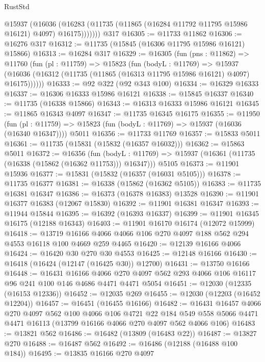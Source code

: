 \begin{lexlean}{RustStd}
\begin{coremodule}
          @15937
            (@16036
              (@16283 (@11735 (@11865 (@16284 @11792 @11795 @15986 @16121) @4097) @16175)))))))
    @317
@16305 := @11733 @11862
@16306 := @16276 @317
@16312 := @11735 (@15845 (@16306 @11795 @15986 @16121) @15866)
@16313 := @16284 @317
@16329 := @16305
    (fun (pns : @11862) =>
    @11760
      (fun (pl : @11759) =>
      @15823
        (fun (bodyL : @11769) =>
        @15937 (@16036 (@16312 (@11735 (@11865 (@16313 @11795 @15986 @16121) @4097) @16175))))))
@16333 := @92 @322 (@92 @343 @100)
@16334 := @16329 @16333
@16337 := @16306 @16333 @15986 @16121
@16338 := @15845 @16337
@16340 := @11735 (@16338 @15866)
@16343 := @16313 @16333 @15986 @16121
@16345 := @11865 @16343 @4097
@16347 := @11735 @16345 @16175
@16355 := @11950
    (fun (pl : @11759) => @15823 (fun (bodyL : @11769) => @15937 (@16036 (@16340 @16347))))
    @5011
@16356 := @11733 @11769
@16357 := @15833 @5011
@16361 := @11735 (@15831 (@15832 (@16357 @16032)))
@16362 := @15863 @5011
@16372 := @16356
    (fun (bodyL : @11769) => @15937 (@16361 (@11735 (@16338 (@15862 (@16362 @11753))) @16347)))
    @5105
@16373 := @11901 @15936
@16377 := @15831 (@15832 (@16357 (@16031 @5105)))
@16378 := @11735 @16377
@16381 := @16338 (@15862 (@16362 @5105))
@16383 := @11735 @16381 @16347
@16386 := @16373 (@16378 @16383) @13528
@16390 := @11901 @16377 @16383 (@12067 @15830)
@16392 := @11901 @16381 @16347
@16393 := @11944 @15844
@16395 := @16392 (@16393 @16337)
@16399 := @11901 @16345 @16175 (@12188 @16343)
@16403 := @11901 @16170 @16174 (@12072 @15999)
@16418 := @13719
    @16166
    @4066
    @4066
    @106
    @270
    @4097
    @188
    @562
    @294
    @4553
    @16118
    @100
    @4669
    @259
    @4465
@16420 := @12139 @16166 @4066
@16424 := @16420 @30 @270 @30 @4553
@16425 := @12148 @16166
@16430 := @16418 (@16424 (@12147 (@16425 @30)) @12700)
@16431 := @13750 @16166
@16448 := @16431
    @16166
    @4066
    @270
    @4097
    @562
    @293
    @4066
    @106
    @16117
    @96
    @241
    @100
    @146
    @4686
    @4471
    @4471
    @5054
@16451 := @12030 (@12335 (@16153 @12336))
@16452 := @12035 @269
@16455 := @12030 (@12203 (@16452 @12204))
@16457 := @16451 (@16455 @16166)
@16482 := @16431
    @16457
    @4066
    @270
    @4097
    @562
    @100
    @4066
    @106
    @4721
    @22
    @184
    @549
    @558
    @5066
    @4471
    @4471
    @16113
    (@13799 @16166 @4066 @270 @4097 @562 @4066 @106)
@16483 := @13821 @562
@16486 := @16482 (@13809 (@16483 @22))
@16487 := @13827 @270
@16488 := @16487 @562
@16492 := @16486 (@12188 (@16488 @100 @184))
@16495 := @13835 @16166 @270 @4097

\end{coremodule}
\end{lexlean}
